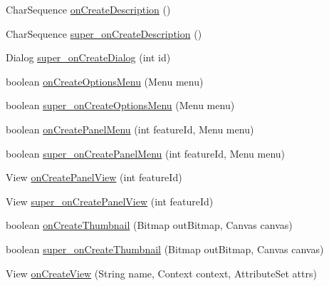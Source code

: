 \begin{DoxyCompactItemize}
\item 
Char\-Sequence \hyperlink{classorg_1_1qtproject_1_1qt5_1_1android_1_1bindings_1_1_qt_activity_af86865337837c2c780913132b7118d69}{on\-Create\-Description} ()
\item 
Char\-Sequence \hyperlink{classorg_1_1qtproject_1_1qt5_1_1android_1_1bindings_1_1_qt_activity_a213a5e7065a1b53244d8b3642a23b2e4}{super\-\_\-on\-Create\-Description} ()
\item 
Dialog \hyperlink{classorg_1_1qtproject_1_1qt5_1_1android_1_1bindings_1_1_qt_activity_a946099e0315e24f0c40338b69e0d1cdf}{super\-\_\-on\-Create\-Dialog} (int id)
\item 
boolean \hyperlink{classorg_1_1qtproject_1_1qt5_1_1android_1_1bindings_1_1_qt_activity_a9303a2dd16e8deb7cdcf143ae6b480f4}{on\-Create\-Options\-Menu} (Menu menu)
\item 
boolean \hyperlink{classorg_1_1qtproject_1_1qt5_1_1android_1_1bindings_1_1_qt_activity_a25d0cb2383a485b28f53026ebe050dd4}{super\-\_\-on\-Create\-Options\-Menu} (Menu menu)
\item 
boolean \hyperlink{classorg_1_1qtproject_1_1qt5_1_1android_1_1bindings_1_1_qt_activity_a617b7c2c432bc9894d3c0b2490d27b41}{on\-Create\-Panel\-Menu} (int feature\-Id, Menu menu)
\item 
boolean \hyperlink{classorg_1_1qtproject_1_1qt5_1_1android_1_1bindings_1_1_qt_activity_a3d105b186ba9bf7d089699dbd5ca3c45}{super\-\_\-on\-Create\-Panel\-Menu} (int feature\-Id, Menu menu)
\item 
View \hyperlink{classorg_1_1qtproject_1_1qt5_1_1android_1_1bindings_1_1_qt_activity_aefde1977c2ccae37e5f1a927f7e9e9ee}{on\-Create\-Panel\-View} (int feature\-Id)
\item 
View \hyperlink{classorg_1_1qtproject_1_1qt5_1_1android_1_1bindings_1_1_qt_activity_ab37f48e1ce50767f29be1cebd4fc96e0}{super\-\_\-on\-Create\-Panel\-View} (int feature\-Id)
\item 
boolean \hyperlink{classorg_1_1qtproject_1_1qt5_1_1android_1_1bindings_1_1_qt_activity_a961e15fb9b7bcdc7e4310e881656e1d7}{on\-Create\-Thumbnail} (Bitmap out\-Bitmap, Canvas canvas)
\item 
boolean \hyperlink{classorg_1_1qtproject_1_1qt5_1_1android_1_1bindings_1_1_qt_activity_a2af36b766142fa45fa77623e549112ac}{super\-\_\-on\-Create\-Thumbnail} (Bitmap out\-Bitmap, Canvas canvas)
\item 
View \hyperlink{classorg_1_1qtproject_1_1qt5_1_1android_1_1bindings_1_1_qt_activity_a4f26e1f33245742068eb9b79689f69e5}{on\-Create\-View} (String name, Context context, Attribute\-Set attrs)

\end{DoxyCompactItemize}
